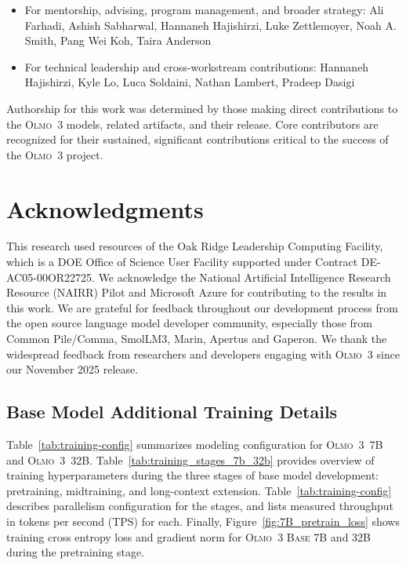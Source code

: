 \documentclass[table]{ai2style/ai2}
\newcommand{\newOlmo}{Olmo\xspace}
\newcommand{\olmothree}{\textsc{\newOlmo~3}\xspace}
\newcommand{\olmothreebase}{\textsc{\newOlmo~3 Base}\xspace}
\begin{document}
{{\begin{itemize}
    \item For mentorship, advising, program management, and broader strategy: Ali Farhadi, Ashish Sabharwal, Hannaneh Hajishirzi, Luke Zettlemoyer, Noah A. Smith, Pang Wei Koh, Taira Anderson

    \item For technical leadership and cross-workstream contributions: Hannaneh Hajishirzi, Kyle Lo, Luca Soldaini, Nathan Lambert, Pradeep Dasigi
\end{itemize}

Authorship for this work was determined by those making direct contributions to the \olmothree models, related artifacts, and their release. 
Core contributors are recognized for their sustained, significant contributions critical to the success of the \olmothree project.

\section*{Acknowledgments}

This research used resources of the Oak Ridge Leadership Computing Facility, which is a DOE Office of Science User Facility supported under Contract DE-AC05-00OR22725. We acknowledge the National Artificial Intelligence Research Resource (NAIRR) Pilot and Microsoft Azure for contributing to the results in this work. We are grateful for feedback throughout our development process from the open source language model developer community, especially those from Common Pile/Comma, SmolLM3, Marin, Apertus and Gaperon.
We thank the widespread feedback from researchers and developers engaging with \olmothree since our November 2025 release.

\subsection{Base Model Additional Training Details}

Table~\ref{tab:training-config} summarizes modeling configuration for \olmothree~7B and \olmothree~32B. 
Table~\ref{tab:training_stages_7b_32b} provides overview of training hyperparameters during the three stages of base model development: pretraining, midtraining, and long-context extension. 
Table~\ref{tab:training-config} describes parallelism configuration for the stages, and lists measured throughput in tokens per second (TPS) for each. 
Finally, Figure~\ref{fig:7B_pretrain_loss} shows training cross entropy loss and gradient norm for \olmothreebase 7B and 32B during the pretraining stage. 

}}
\end{document}
